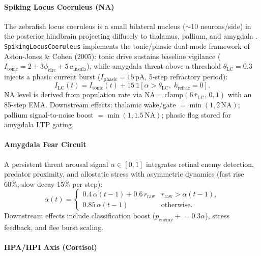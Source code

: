 \documentclass[12pt]{article}
\begin{document}
\paragraph{Spiking Locus Coeruleus (NA)}

The zebrafish locus coeruleus is a small bilateral nucleus ($\sim$10 neurons/side)
in the posterior hindbrain projecting diffusely to thalamus, pallium, and amygdala
\citep{astonjones2005,singh2015}.
\texttt{SpikingLocusCoeruleus} implements the tonic/phasic dual-mode framework
of Aston-Jones \& Cohen (2005): tonic drive sustains baseline vigilance
($I_\text{tonic} = 2 + 3\phi_\text{circ} + 5\,a_\text{insula}$),
while amygdala threat above a threshold $\theta_\text{LC} = 0.3$ injects a
phasic current burst ($I_\text{phasic} = 15$\,pA, 5-step refractory period):
\begin{equation}\label{eq:lc_phasic}
  I_\text{LC}(t) = I_\text{tonic}(t)
    + 15\,\mathbb{1}\!\left[\alpha > \theta_\text{LC},\;
      k_\text{refrac}=0\right].
\end{equation}
NA level is derived from population rate via
$\text{NA} = \text{clamp}(6\,\bar{r}_\text{LC},\,0,1)$
with an 85-step EMA.
Downstream effects: thalamic wake/gate $= \min(1, 2\,\text{NA})$;
pallium signal-to-noise boost $= \min(1, 1.5\,\text{NA})$;
phasic flag stored for amygdala LTP gating.

\paragraph{Amygdala Fear Circuit}

A persistent threat arousal signal $\alpha \in [0,1]$ integrates
retinal enemy detection, predator proximity, and allostatic stress
with asymmetric dynamics (fast rise 60\%, slow decay 15\% per step):
\begin{equation}\label{eq:amygdala}
  \alpha(t) = \begin{cases}
    0.4\,\alpha(t{-}1) + 0.6\,r_\text{raw} & r_\text{raw} > \alpha(t{-}1), \\
    0.85\,\alpha(t{-}1) & \text{otherwise}.
  \end{cases}
\end{equation}
Downstream effects include classification boost
($p_\text{enemy} \mathrel{+}= 0.3\alpha$), stress feedback, and
flee burst scaling.

\paragraph{HPA/HPI Axis (Cortisol)}
\end{document}
